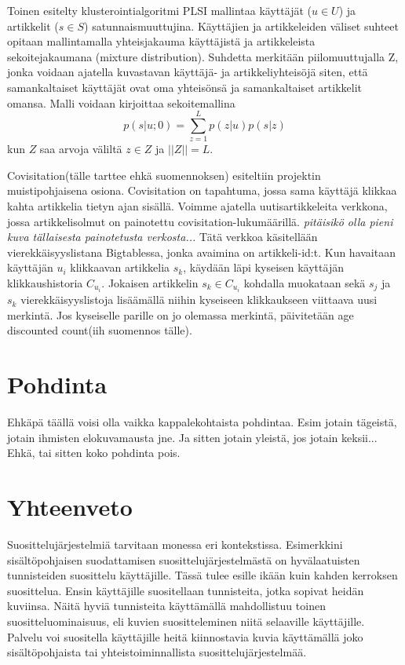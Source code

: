 \documentclass[12pt,finnish]{tktltiki2}
\theoremstyle{definition}
\theoremstyle{remark}
\begin{document}
Toinen esitelty klusterointialgoritmi PLSI mallintaa käyttäjät ($u \in U$) ja artikkelit ($s \in S$) satunnaismuuttujina.
Käyttäjien ja artikkeleiden väliset suhteet opitaan mallintamalla yhteisjakauma käyttäjistä ja artikkeleista sekoitejakaumana (mixture distribution).
Suhdetta merkitään piilomuuttujalla Z, jonka voidaan ajatella kuvastavan käyttäjä- ja artikkeliyhteisöjä siten, että samankaltaiset käyttäjät ovat oma yhteisönsä ja samankaltaiset artikkelit omansa. Malli voidaan kirjoittaa sekoitemallina
\begin{displaymath}
p(s|u;0)= \sum_{z=1}^{L} {p(z|u)}{p(s|z)}
\end{displaymath}
kun $Z$ saa arvoja väliltä $z \in Z$ ja $||Z|| = L$.

Covisitation(tälle tarttee ehkä suomennoksen) esiteltiin projektin muistipohjaisena osiona. Covisitation on tapahtuma, jossa sama käyttäjä klikkaa kahta artikkelia tietyn ajan sisällä. Voimme ajatella uutisartikkeleita verkkona, jossa artikkelisolmut on painotettu covisitation-lukumäärillä.   
\textit{pitäisikö olla pieni kuva tällaisesta painotetusta verkosta...}
Tätä verkkoa käsitellään vierekkäisyyslistana Bigtablessa, jonka avaimina on artikkeli-id:t.
Kun havaitaan käyttäjän $u_i$ klikkaavan artikkelia $s_k$, käydään läpi kyseisen käyttäjän klikkaushistoria $C_{u_{i}}$. Jokaisen artikkelin $s_k \in C_{u_{i}}$ kohdalla muokataan sekä $s_j$ ja $s_k$ vierekkäisyyslistoja lisäämällä niihin kyseiseen klikkaukseen viittaava uusi merkintä. Jos kyseiselle parille on jo olemassa merkintä, päivitetään age discounted count(iih suomennos tälle).

\section{Pohdinta}
Ehkäpä täällä voisi olla vaikka kappalekohtaista pohdintaa. Esim jotain tägeistä, jotain ihmisten elokuvamausta jne. Ja sitten jotain yleistä, jos jotain keksii... Ehkä, tai sitten koko pohdinta pois.

        
\section{Yhteenveto}

Suosittelujärjestelmiä tarvitaan monessa eri kontekstissa. Esimerkkini sisältöpohjaisen suodattamisen suosittelujärjestelmästä on hyvälaatuisten tunnisteiden suosittelu käyttäjille. Tässä tulee esille ikään kuin kahden kerroksen suosittelua. Ensin käyttäjille suositellaan tunnisteita, jotka sopivat heidän kuviinsa. Näitä hyviä tunnisteita käyttämällä mahdollistuu toinen suositteluominaisuus, eli kuvien suositteleminen niitä selaaville käyttäjille. Palvelu voi suositella käyttäjille heitä kiinnostavia kuvia käyttämällä joko sisältöpohjaista tai yhteistoiminnallista suosittelujärjestelmää.
\end{document}
